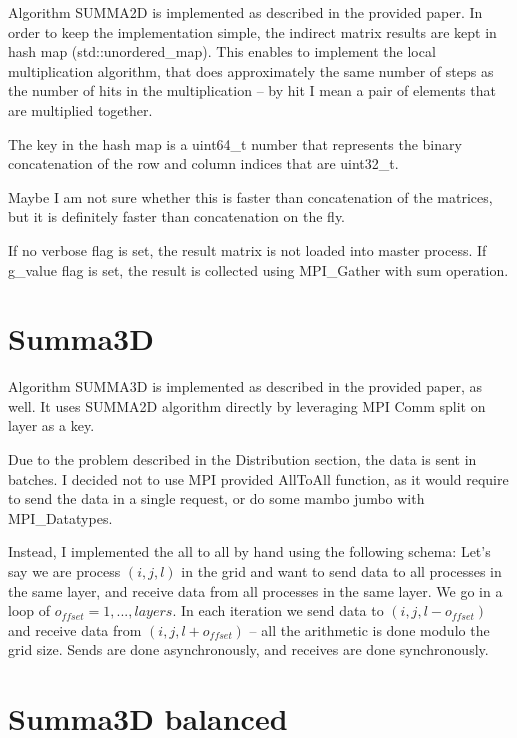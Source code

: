 \documentclass[a4paper,12pt]{article}
\begin{document}
    Algorithm SUMMA2D is implemented as described in the provided paper.
    In order to keep the implementation simple, the indirect matrix results
    are kept in hash map (std::unordered\_map). This enables to implement
    the local multiplication algorithm, that does approximately the same
    number of steps as the number of hits in the multiplication --
    by hit I mean a pair of elements that are multiplied together.

    The key in the hash map is a uint64\_t number that represents
    the binary concatenation of the row and column indices that are uint32\_t.

    Maybe I am not sure whether this is faster than concatenation of the
    matrices, but it is definitely faster than concatenation on the fly.

    If no verbose flag is set, the result matrix is not loaded into master process.
    If g\_value flag is set, the result is collected using MPI\_Gather with sum operation.

    \section{ Summa3D }

    Algorithm SUMMA3D is implemented as described in the provided paper, as well.
    It uses SUMMA2D algorithm directly by leveraging MPI Comm split on layer as a key.

    Due to the problem described in the Distribution section, the data is sent in batches.
    I decided not to use MPI provided AllToAll function, as it would require to send
    the data in a single request, or do some mambo jumbo with MPI\_Datatypes.

    Instead, I implemented the all to all by hand using the following schema:
    Let's say we are process $(i, j, l)$ in the grid and want to send data
    to all processes in the same layer, and receive data from all processes in the same layer.
    We go in a loop of $o_{ffset} = 1, ..., layers$.
    In each iteration we send data to $(i, j, l - o_{ffset})$ and receive data from $(i, j, l + o_{ffset})$
    -- all the arithmetic is done modulo the grid size. Sends are done asynchronously,
    and receives are done synchronously.

    \section{ Summa3D balanced }
\end{document}
